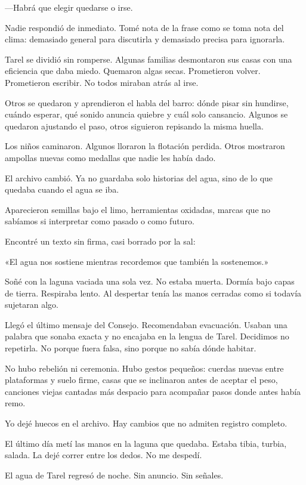 —Habrá que elegir quedarse o irse.

Nadie respondió de inmediato. Tomé nota de la frase como se toma nota del clima: demasiado general para discutirla y demasiado precisa para ignorarla.

Tarel se dividió sin romperse. Algunas familias desmontaron sus casas con una eficiencia que daba miedo. Quemaron algas secas. Prometieron volver. Prometieron escribir. No todos miraban atrás al irse.

Otros se quedaron y aprendieron el habla del barro: dónde pisar sin hundirse, cuándo esperar, qué sonido anuncia quiebre y cuál solo cansancio. Algunos se quedaron ajustando el paso, otros siguieron repisando la misma huella.

Los niños caminaron. Algunos lloraron la flotación perdida. Otros mostraron ampollas nuevas como medallas que nadie les había dado.

El archivo cambió. Ya no guardaba solo historias del agua, sino de lo que quedaba cuando el agua se iba.

Aparecieron semillas bajo el limo, herramientas oxidadas, marcas que no sabíamos si interpretar como pasado o como futuro.

Encontré un texto sin firma, casi borrado por la sal:

\begin{cita}
«El agua nos sostiene mientras recordemos que también la sostenemos.»
\end{cita}
Soñé con la laguna vaciada una sola vez. No estaba muerta. Dormía bajo capas de tierra. Respiraba lento. Al despertar tenía las manos cerradas como si todavía sujetaran algo.

Llegó el último mensaje del Consejo. Recomendaban evacuación. Usaban una palabra que sonaba exacta y no encajaba en la lengua de Tarel. Decidimos no repetirla. No porque fuera falsa, sino porque no sabía dónde habitar.

No hubo rebelión ni ceremonia. Hubo gestos pequeños: cuerdas nuevas entre plataformas y suelo firme, casas que se inclinaron antes de aceptar el peso, canciones viejas cantadas más despacio para acompañar pasos donde antes había remo.

Yo dejé huecos en el archivo. Hay cambios que no admiten registro completo.

El último día metí las manos en la laguna que quedaba. Estaba tibia, turbia, salada. La dejé correr entre los dedos. No me despedí.

El agua de Tarel regresó de noche. Sin anuncio. Sin señales.

